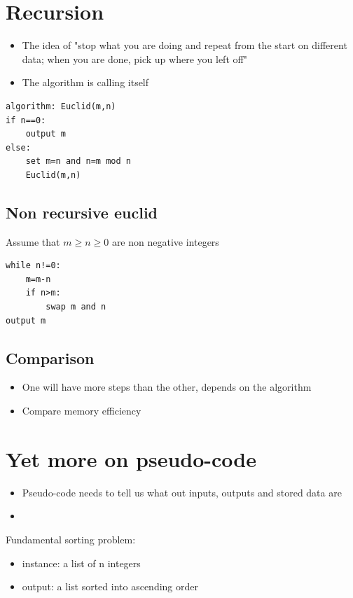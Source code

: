 \documentclass{article}[18pt]
\begin{document}
\section{Recursion}
\begin{itemize}
	\item The idea of "stop what you are doing and repeat from the start on different data; when you are done, pick up where you left off"
	\item The algorithm is calling itself
\end{itemize}
\begin{verbatim}
algorithm: Euclid(m,n)
if n==0:
	output m
else:
	set m=n and n=m mod n
	Euclid(m,n)
\end{verbatim}
\subsection{Non recursive euclid}
Assume that $m\geq n\geq 0$ are non negative integers
\begin{verbatim}
while n!=0:	
	m=m-n
	if n>m:
		swap m and n
output m
\end{verbatim}
\subsection{Comparison}
\begin{itemize}
	\item One will have more steps than the other, depends on the algorithm
	\item Compare memory efficiency
\end{itemize}
\section{Yet more on pseudo-code}
\begin{itemize}
	\item Pseudo-code needs to tell us what out inputs, outputs and stored data are
	\item 
\end{itemize}
Fundamental sorting problem:
\begin{itemize}
	\item instance: a list of n integers
	\item output: a list sorted into ascending order
\end{itemize}
\end{document}
